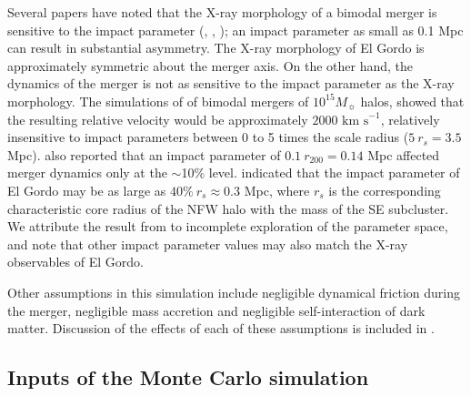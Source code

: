\documentclass[letterpaper,useAMS,usenatbib]{mn2e}
\begin{document}
Several papers have noted that the X-ray morphology of a bimodal merger is
sensitive to the impact parameter (\citealt{Springel2007},
\citealt{Ricker98}, \citealt{Mastropietro2008a}); an impact
parameter as small as 0.1 Mpc can result in substantial asymmetry. 
The X-ray morphology of El Gordo is approximately symmetric about the merger axis. 
On the other hand, the dynamics of the merger is not as sensitive to the
impact parameter as the X-ray morphology. The simulations of
\cite{Ricker98} of bimodal mergers of $10^{15} M_{\sun}$ halos, showed that the
resulting relative velocity would be approximately $2000 \text{ km s}^{-1}$, relatively
insensitive to impact parameters between 0 to 5 times the scale radius ($5~r_s = 3.5$ Mpc). \cite{Mastropietro2008a} also reported that
an impact parameter of $0.1~r_{200} = 0.14$ Mpc affected merger dynamics only
at the $\sim$10\% level. \citealt{Molnar14} indicated that the impact parameter of El Gordo
may be as large as $40\%~r_s \approx 0.3$ Mpc, where $r_s$ is
the corresponding characteristic core
radius of the NFW halo with the mass of the SE subcluster. We attribute
the result from \citealt{Molnar14} to incomplete exploration of
the parameter space, and note that other impact parameter values may also match the
X-ray observables of El Gordo. \par
Other assumptions in this simulation include negligible dynamical friction
during the merger, negligible mass accretion and negligible self-interaction
of dark matter. Discussion of the effects of each of these assumptions is
included in .  
\subsection{Inputs of the Monte Carlo simulation} \label{sec:inputs}
\end{document}
